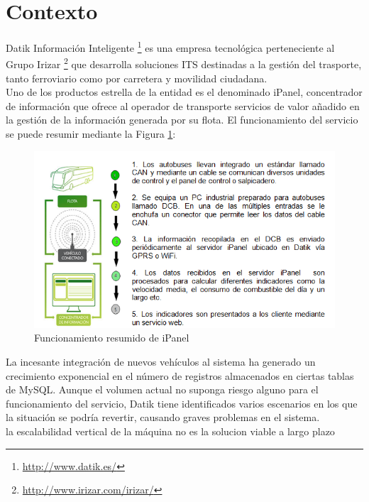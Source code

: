 \section{Contexto}
 
Datik Información Inteligente \footnote{\url{http://www.datik.es/}} es una empresa tecnológica perteneciente al Grupo Irizar \footnote{\url{http://www.irizar.com/irizar/}}  que desarrolla soluciones ITS destinadas a la gestión del trasporte, tanto ferroviario como por carretera y movilidad ciudadana.\\

Uno de los productos estrella de la entidad es el denominado iPanel, concentrador de  información que ofrece al operador de transporte servicios de valor añadido en la gestión de la información generada por su flota. El funcionamiento del servicio se puede resumir mediante la Figura \ref{fig:ipanel}:\\

\begin{figure}[h]
	\centering
	\includegraphics[width=1\textwidth]{Ilustraciones/ipanel_infraesctructure.png}
	\caption{Funcionamiento resumido de iPanel}
	\label{fig:ipanel}
\end{figure}

La incesante integración de nuevos vehículos al sistema ha generado un crecimiento exponencial en el número de registros almacenados en ciertas tablas de MySQL. Aunque el volumen actual no suponga riesgo alguno para el funcionamiento del servicio, Datik tiene identificados varios escenarios en los que la situación se podría revertir, causando graves problemas en el sistema.\\ 

la escalabilidad vertical de la máquina no es la solucion viable a largo plazo

